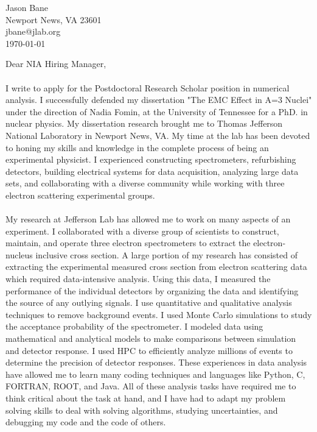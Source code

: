 \documentclass[12pt,letterpaper]{article}
\newcommand{\CPP}
{C\nolinebreak[4]\hspace{-.05em}\raisebox{.22ex}{\footnotesize\bf ++}}
\begin{document}
\vspace*{-1.2cm}
\noindent Jason Bane\\
Newport News, VA 23601 \\
jbane@jlab.org \\

\noindent\today\\

\noindent 

Dear NIA Hiring Manager, 

\paragraph{}I write to apply for the Postdoctoral Research Scholar position in numerical analysis. I successfully defended my dissertation "The EMC Effect in A=3 Nuclei" under the direction of Nadia Fomin, at the University of Tennessee for a PhD. in nuclear physics. My dissertation research brought me to Thomas Jefferson National Laboratory in Newport News, VA. My time at the lab has been devoted to honing my skills and knowledge in the complete process of being an experimental physicist. I experienced constructing spectrometers, refurbishing detectors, building electrical systems for data acquisition, analyzing large data sets, and collaborating with a diverse community while working with three electron scattering experimental groups.

\paragraph{}My research at Jefferson Lab has allowed me to work on many aspects of an experiment. I collaborated with a diverse group of scientists to construct, maintain, and operate three electron spectrometers to extract the electron-nucleus inclusive cross section. A large portion of my research has consisted of extracting the experimental measured cross section from electron scattering data which required data-intensive analysis. Using this data, I measured the performance of the individual detectors by organizing the data and identifying the source of any outlying signals. I use quantitative and qualitative analysis techniques to remove background events. I used Monte Carlo simulations to study the acceptance probability of the spectrometer. I modeled data using mathematical and analytical models to make comparisons between simulation and detector response. I used HPC to efficiently analyze millions of events to determine the precision of detector responses. These experiences in data analysis have allowed me to learn many coding techniques and languages like Python, \CPP, FORTRAN, ROOT, and Java. All of these analysis tasks have required me to think critical about the task at hand, and I have had to adapt my problem solving skills to deal with solving algorithms, studying uncertainties, and debugging my code and the code of others.   
\end{document}
